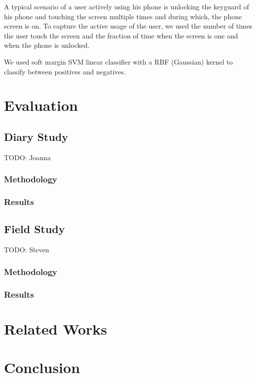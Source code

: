 \documentclass{article}
\begin{document}
A typical scenario of a user actively using his phone is unlocking the keyguard of his phone and touching the screen multiple times and during which, the phone screen is on. 
To capture the active usage of the user, we used the number of times the user touch the screen and the fraction of time when the screen is one and when the phone is unlocked. 

We used soft margin SVM linear classifier with a RBF (Gaussian) kernel to classify between positives and negatives. 
\section{Evaluation}
\subsection{Diary Study}
TODO: Joanna
\subsubsection{Methodology}
\subsubsection{Results}

\subsection{Field Study}
TODO: Steven
\subsubsection{Methodology}
\subsubsection{Results}

\section{Related Works}
\section{Conclusion}
\end{document}
